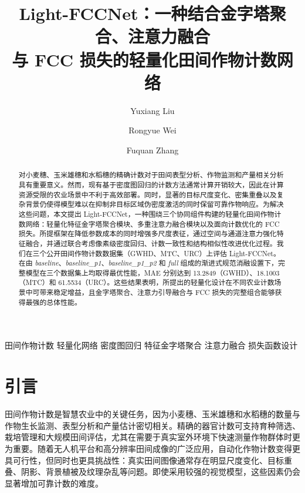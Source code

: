 \documentclass[a4paper,fleqn]{cas-sc}
\newcommand{\sep}{\quad}
\begin{document}
\let\WriteBookmarks\relax
\def\floatpagepagefraction{1}
\def\textpagefraction{.001}


\title[mode = title]{\texorpdfstring{Light-FCCNet：一种结合金字塔聚合、注意力融合\\与 FCC 损失的轻量化田间作物计数网络}{Light-FCCNet：一种结合金字塔聚合、注意力融合与 FCC 损失的轻量化田间作物计数网络}}

\author{Yuxiang Liu}
\author{Rongyue Wei}
\author{Fuquan Zhang}

\begin{abstract}
对小麦穗、玉米雄穗和水稻穗的精确计数对于田间表型分析、作物监测和产量相关分析具有重要意义。然而，现有基于密度图回归的计数方法通常计算开销较大，因此在计算资源受限的农业场景中不利于高效部署。同时，显著的目标尺度变化、密集重叠以及复杂背景仍使得模型难以在抑制非目标区域伪密度激活的同时保留可靠作物响应。为解决这些问题，本文提出 Light-FCCNet，一种围绕三个协同组件构建的轻量化田间作物计数网络：轻量化特征金字塔聚合模块、多重注意力融合模块以及面向计数优化的 FCC 损失。所提框架在降低参数成本的同时增强多尺度表征，通过空间与通道注意力强化特征融合，并通过联合考虑像素级密度回归、计数一致性和结构相似性改进优化过程。我们在三个公开田间作物计数数据集（GWHD、MTC、URC）上评估 Light-FCCNet。在由 \textit{baseline}、\textit{baseline\_p1}、\textit{baseline\_p1\_p2} 和 \textit{full} 组成的渐进式规范消融设置下，完整模型在三个数据集上均取得最优性能，MAE 分别达到 13.2849（GWHD）、18.1003（MTC）和 61.5534（URC）。这些结果表明，所提出的轻量化设计在不同农业计数场景中可带来稳定增益，且金字塔聚合、注意力引导融合与 FCC 损失的完整组合能够获得最强的总体性能。
\end{abstract}

\begin{keywords}
田间作物计数 \sep 轻量化网络 \sep 密度图回归 \sep 特征金字塔聚合 \sep 注意力融合 \sep 损失函数设计
\end{keywords}

\maketitle

\section{引言}
\linenumbers

田间作物计数是智慧农业中的关键任务，因为小麦穗、玉米雄穗和水稻穗的数量与作物生长监测、表型分析和产量估计密切相关。精确的器官计数可支持育种筛选、栽培管理和大规模田间评估，尤其在需要于真实室外环境下快速测量作物群体时更为重要。随着无人机平台和高分辨率田间成像的广泛应用，自动化作物计数变得更具可行性，但同时也更具挑战性：真实田间图像通常存在明显尺度变化、目标重叠、阴影、背景植被及纹理杂乱等问题。即使采用较强的视觉模型，这些因素仍会显著增加可靠计数的难度。
\end{document}
